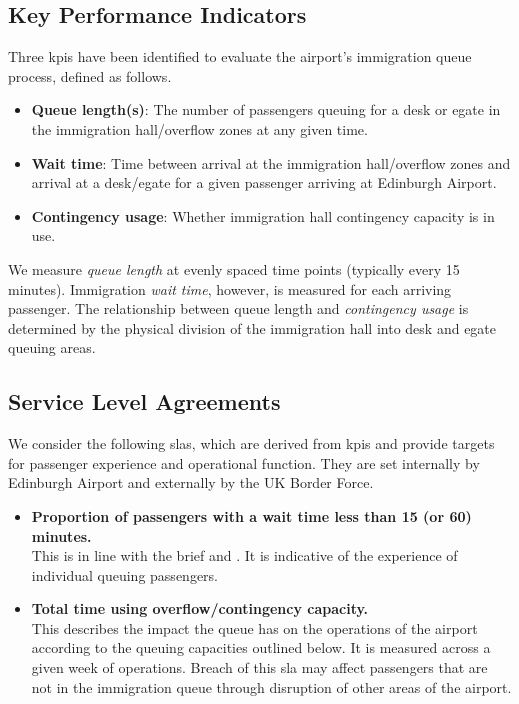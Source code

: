 \documentclass[10pt]{article}
\begin{document}
\subsection{Key Performance Indicators} \label{sec_kpi}

Three \glspl{kpi} have been identified to evaluate the airport's immigration queue process, defined as follows.

\begin{itemize}
    \item \textbf{Queue length(s)}: The number of passengers queuing for a desk or \gls{egate} in the immigration hall/overflow zones at any given time.
    \item \textbf{Wait time}: Time between arrival at the immigration hall/overflow zones and arrival at a desk/\gls{egate} for a given passenger arriving at Edinburgh Airport. 
    \item \textbf{Contingency usage}: Whether immigration hall contingency capacity is in use.
\end{itemize}

We measure \textit{queue length} at evenly spaced time points (typically every 15 minutes). Immigration \textit{wait time}, however, is measured for each arriving passenger. The relationship between queue length and \textit{contingency usage} is determined by the physical division of the immigration hall into desk and \gls{egate} queuing areas.

\subsection{Service Level Agreements} \label{sec_sla}
We consider the following \glspl{sla}, which are derived from \glspl{kpi} and provide targets for passenger experience and operational function. They are set internally by Edinburgh Airport and externally by the UK Border Force. 
\begin{itemize}
    \item \textbf{Proportion of passengers with a wait time less than 15 (or 60) minutes.} \\
    This is in line with the brief and \cite{UK_border_2025}. It is indicative of the experience of individual queuing passengers.
    \item \textbf{Total time using overflow/contingency capacity.} \\
    This describes the impact the queue has on the operations of the airport according to the queuing capacities outlined below. It is measured across a given week of operations. Breach of this \gls{sla} may affect passengers that are not in the immigration queue through disruption of other areas of the airport.
\end{itemize}
\end{document}
